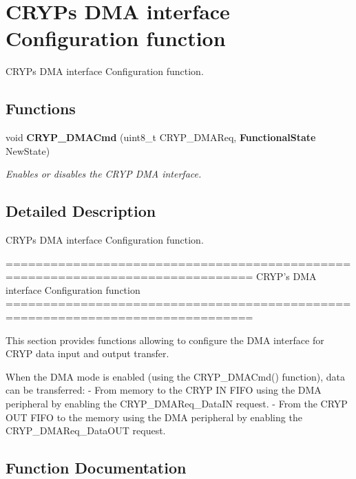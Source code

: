 \section{C\+R\+YP\textquotesingle{}s D\+MA interface Configuration function}
\label{group__CRYP__Group4}


C\+R\+YP\textquotesingle{}s D\+MA interface Configuration function.  


\subsection*{Functions}
\begin{DoxyCompactItemize}
\item 
void \textbf{ C\+R\+Y\+P\+\_\+\+D\+M\+A\+Cmd} (uint8\+\_\+t C\+R\+Y\+P\+\_\+\+D\+M\+A\+Req, \textbf{ Functional\+State} New\+State)
\begin{DoxyCompactList}\small\item\em Enables or disables the C\+R\+YP D\+MA interface. \end{DoxyCompactList}\end{DoxyCompactItemize}


\subsection{Detailed Description}
C\+R\+YP\textquotesingle{}s D\+MA interface Configuration function. 

\begin{DoxyVerb} ===============================================================================
                   CRYP's DMA interface Configuration function
 ===============================================================================  

  This section provides functions allowing to configure the DMA interface for 
  CRYP data input and output transfer.
   
  When the DMA mode is enabled (using the CRYP_DMACmd() function), data can be 
  transferred:
  - From memory to the CRYP IN FIFO using the DMA peripheral by enabling 
    the CRYP_DMAReq_DataIN request.
  - From the CRYP OUT FIFO to the memory using the DMA peripheral by enabling 
    the CRYP_DMAReq_DataOUT request.\end{DoxyVerb}
 

\subsection{Function Documentation}
\mbox{\label{group__CRYP__Group4_ga111d0ec56facb27f8367ce6a33869115}} 
